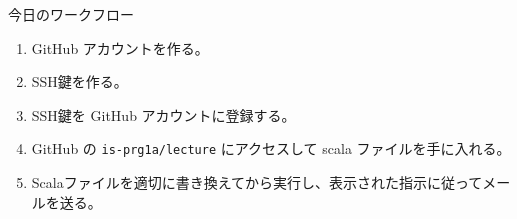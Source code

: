 \documentclass[a4paper]{article}
\begin{document}
\noindent
今日のワークフロー
\begin{enumerate}
\item GitHub アカウントを作る。
\item SSH鍵を作る。
\item SSH鍵を GitHub アカウントに登録する。
\item GitHub の \texttt{is-prg1a/lecture} にアクセスして scala ファイルを手に入れる。
\item Scalaファイルを適切に書き換えてから実行し、表示された指示に従ってメールを送る。
\end{enumerate}
\end{document}
